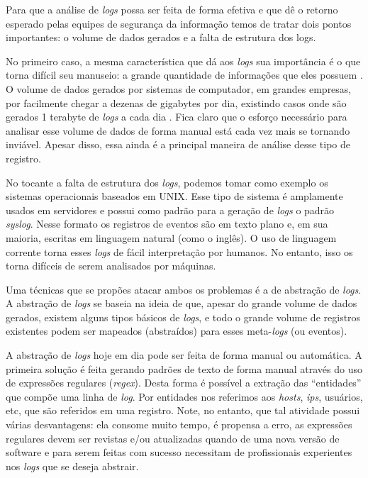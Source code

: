 \documentclass[
	12pt,				%
	openright,			%
	twoside,			%
	a4paper,			%
	english,			%
	spanish,			%
	brazil,				%
	]{abntex2}
\begin{document}
Para que a análise de \emph{logs} possa ser feita de forma efetiva e que dê o retorno esperado pelas equipes de segurança da informação temos de tratar dois pontos importantes: o volume de dados gerados e a falta de estrutura dos logs.

No primeiro caso, a mesma característica que dá aos \emph{logs} sua importância é o que torna difícil seu manuseio: a grande quantidade de informações que eles possuem \cite{brugger2001data,miranskyy2016data,nagappan2010abstracting,vaarandi2003data}. O volume de dados gerados por sistemas de computador, em grandes empresas, por facilmente chegar a dezenas de gigabytes por dia, existindo casos onde são gerados 1 terabyte de \emph{logs} a cada dia \cite{yen2013beehive}. Fica claro que o esforço necessário para analisar esse volume de dados de forma manual está cada vez mais se tornando inviável. Apesar disso, essa ainda é a principal maneira de análise desse tipo de registro.

No tocante a falta de estrutura dos \emph{logs}, podemos tomar como exemplo os sistemas operacionais baseados em UNIX\texttrademark. Esse tipo de sistema é amplamente usados em servidores \cite{w3techs-osusage} e possui como padrão para a geração de \emph{logs} o padrão \emph{syslog}. Nesse formato os registros de eventos são em texto plano e, em sua maioria, escritas em linguagem natural (como o inglês). O uso de linguagem corrente torna esses \emph{logs} de fácil interpretação por humanos. No entanto, isso os torna difíceis de serem analisados por máquinas.


Uma técnicas que se propões atacar ambos os problemas é a de abstração de \emph{logs}. A abstração de \emph{logs} se baseia na ideia de que, apesar do grande volume de dados gerados, existem alguns tipos básicos de \emph{logs}, e todo o grande volume de registros existentes podem ser mapeados (abstraídos) para esses meta-\emph{logs} (ou eventos). 

A abstração de \emph{logs} hoje em dia pode ser feita de forma manual ou automática. A primeira solução é feita gerando padrões de texto de forma manual através do uso de expressões regulares (\emph{regex}). Desta forma é possível a extração das ``entidades'' que compõe uma linha de \emph{log}. Por entidades nos referimos aos \emph{hosts}, \emph{ips}, usuários, etc, que são referidos em uma registro. Note, no entanto, que tal atividade possui várias desvantagens: ela consome muito tempo, é propensa a erro, as expressões regulares devem ser revistas e/ou atualizadas quando de uma nova versão de software e para serem feitas com sucesso necessitam de profissionais experientes nos \emph{logs} que se deseja abstrair.
\end{document}
